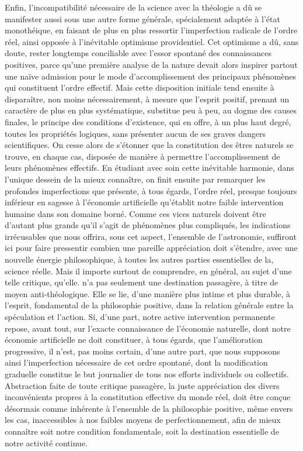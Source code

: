 \documentclass[french,twoside]{book} %
\begin{document}
Enfin, l’incompatibilité nécessaire de la science avec la théologie a dû se manifester aussi sous une autre forme générale, spécialement adaptée à l’état monothéique, en faisant de plus en plus ressortir l’imperfection radicale de l’ordre réel, ainsi opposée à l’inévitable optimisme providentiel. Cet optimisme a dû, sans doute, rester longtemps conciliable avec l’essor spontané des connaissances positives, parce qu’une première analyse de la nature devait alors inspirer partout une naïve admission pour le mode d’accomplissement des principaux phénomènes qui constituent l’ordre effectif. Mais cette disposition initiale tend ensuite à disparaître, non moins nécessairement, à mesure que l’esprit positif, prenant un caractère de plus en plus systématique, substitue peu à peu, au dogme des causes finales, le principe des conditions d’existence, qui en offre, à un plus haut degré, toutes les propriétés logiques, sans présenter aucun de ses graves dangers scientifiques. On cesse alors de s’étonner que la constitution des êtres naturels se trouve, en chaque cas, disposée de manière à permettre l’accomplissement de leurs phénomènes effectifs. En étudiant avec soin cette inévitable harmonie, dans l’unique dessein de la mieux connaître, on finit ensuite par remarquer les profondes imperfections que présente, à tous égards, l’ordre réel, presque toujours inférieur en sagesse à l’économie artificielle qu’établit notre faible intervention humaine dans son domaine borné. Comme ces vices naturels doivent être d’autant plus grands qu’il s’agit de phénomènes plus compliqués, les indications irrécusables que nous offrira, sous cet aspect, l’ensemble de l’astronomie, suffiront ici pour faire pressentir combien une pareille appréciation doit s’étendre, avec une nouvelle énergie philosophique, à toutes les autres parties essentielles de la, science réelle. Mais il importe surtout de comprendre, en général, au sujet d’une telle critique, qu’elle. n’a pas seulement une destination passagère, à titre de moyen anti-théologique. Elle se lie, d’une manière plus intime et plus durable, à l’esprit, fondamental de la philosophie positive, dans la relation générale entre la spéculation et l’action. Si, d’une part, notre active intervention permanente repose, avant tout, sur l’exacte connaissance de l’économie naturelle, dont notre économie artificielle ne doit constituer, à tous égards, que l’amélioration progressive, il n’est, pas moins certain, d’une autre part, que nous supposons ainsi l’imperfection nécessaire de cet ordre spontané, dont la modification graduelle constitue le but journalier de tous nos efforts individuels ou collectifs. Abstraction faite de toute critique passagère, la juste appréciation des divers inconvénients propres à la constitution effective du monde réel, doit être conçue désormais comme inhérente à l’ensemble de la philosophie positive, même envers les cas, inaccessibles à nos faibles moyens de perfectionnement, afin de mieux connaître soit notre condition fondamentale, soit la destination essentielle de notre activité continue.\par
\end{document}
